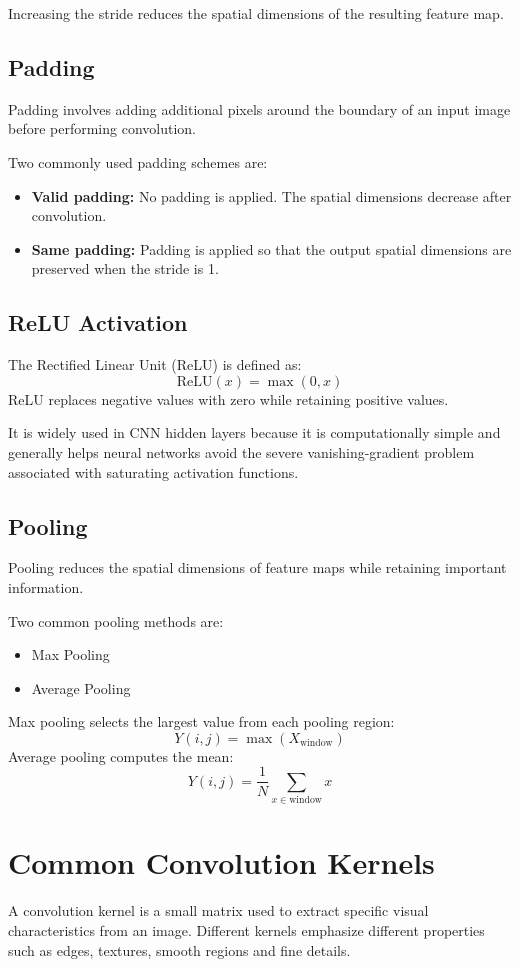 \documentclass[11pt]{article}
\begin{document}
Increasing the stride reduces the spatial dimensions of the resulting feature map.

\subsection{Padding}
Padding involves adding additional pixels around the boundary of an input image before performing convolution.

Two commonly used padding schemes are:
\begin{itemize}
    \item \textbf{Valid padding:} No padding is applied. The spatial dimensions decrease after convolution.
    \item \textbf{Same padding:} Padding is applied so that the output spatial dimensions are preserved when the stride is 1.
\end{itemize}

\subsection{ReLU Activation}
The Rectified Linear Unit (ReLU) is defined as:
\[
\mathrm{ReLU}(x) = \max(0, x)
\]
ReLU replaces negative values with zero while retaining positive values.

It is widely used in CNN hidden layers because it is computationally simple and generally helps neural networks avoid the severe vanishing-gradient problem associated with saturating activation functions.

\subsection{Pooling}
Pooling reduces the spatial dimensions of feature maps while retaining important information.

Two common pooling methods are:
\begin{itemize}
    \item Max Pooling
    \item Average Pooling
\end{itemize}

Max pooling selects the largest value from each pooling region:
\[
Y(i,j) = \max(X_{\text{window}})
\]
Average pooling computes the mean:
\[
Y(i,j) = \frac{1}{N} \sum_{x \in \text{window}} x
\]

\section{Common Convolution Kernels}
A convolution kernel is a small matrix used to extract specific visual characteristics from an image. Different kernels emphasize different properties such as edges, textures, smooth regions and fine details.
\end{document}
